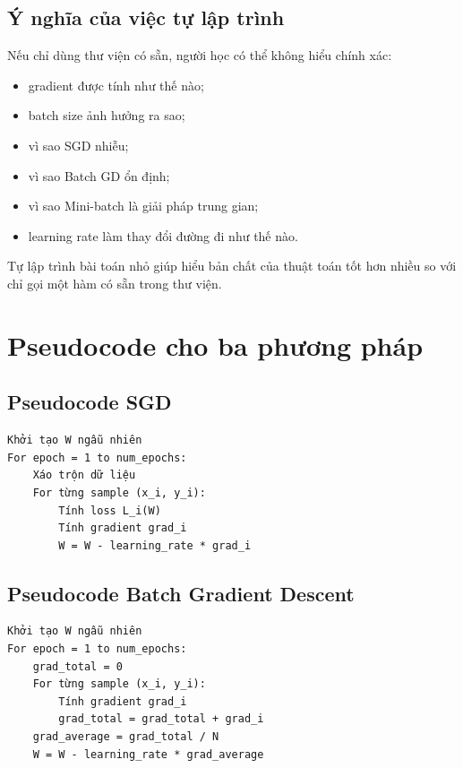 \subsection{Ý nghĩa của việc tự lập trình}

Nếu chỉ dùng thư viện có sẵn, người học có thể không hiểu chính xác:

\begin{itemize}
    \item gradient được tính như thế nào;
    \item batch size ảnh hưởng ra sao;
    \item vì sao SGD nhiễu;
    \item vì sao Batch GD ổn định;
    \item vì sao Mini-batch là giải pháp trung gian;
    \item learning rate làm thay đổi đường đi như thế nào.
\end{itemize}

\begin{ghinho}
Tự lập trình bài toán nhỏ giúp hiểu bản chất của thuật toán tốt hơn nhiều so với chỉ gọi một hàm có sẵn trong thư viện.
\end{ghinho}

\section{Pseudocode cho ba phương pháp}

\subsection{Pseudocode SGD}

\begin{verbatim}
Khởi tạo W ngẫu nhiên
For epoch = 1 to num_epochs:
    Xáo trộn dữ liệu
    For từng sample (x_i, y_i):
        Tính loss L_i(W)
        Tính gradient grad_i
        W = W - learning_rate * grad_i
\end{verbatim}

\subsection{Pseudocode Batch Gradient Descent}

\begin{verbatim}
Khởi tạo W ngẫu nhiên
For epoch = 1 to num_epochs:
    grad_total = 0
    For từng sample (x_i, y_i):
        Tính gradient grad_i
        grad_total = grad_total + grad_i
    grad_average = grad_total / N
    W = W - learning_rate * grad_average
\end{verbatim}

